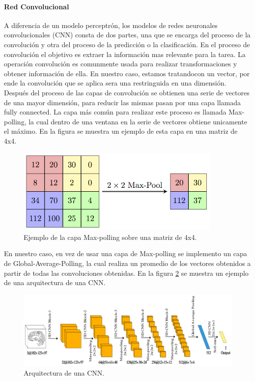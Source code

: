 \paragraph{Red Convolucional}

A diferencia de un modelo perceptrón, los modelos de redes neuronales convolucionales (CNN) consta de dos partes, una que se encarga del proceso de la convolución y otra del proceso de la predicción o la clasificación. En el proceso de convolución el objetivo es extraer la información mas relevante para la tarea. La operación convolución es comunmente usada para realizar transformaciones y obtener información de ella\cite{Unser_1995,Boellaard_1997,Hang_Gao_2009}. En nuestro caso, estamos tratandocon un vector, por ende la convolución que se aplica sera una restringuida en una dimensión. Después del proceso de las capas de convolución se obtienen una serie de vectores de una mayor dimensión, para reducir las mismas pasan por una capa llamada fully connected. La capa más común para realizar este proceso es llamada Max-polling, la cual dentro de una ventana en la serie de vectores obtiene unicamente el máximo. En la figura se muestra un ejemplo de esta capa en una matriz de 4x4.

\begin{figure}[H]
	\centering
	\includegraphics[width=10cm]{Graphics/maxpolling.png}
	\caption{Ejemplo de la capa Max-polling sobre una matriz de 4x4\cite{max_polling_image}.}
	\label{fig:maxpolling}
\end{figure}

En nuestro caso, en vez de usar una capa de Max-polling se implemento un capa de Global-Average-Polling\cite{min_2013}, la cual realiza un promedio de los vectores obtenidos a partir de todas las convoluciones obtenidas. En la figura \ref{fig:cnn} se muestra un ejemplo de una arquitectura de una CNN.

\begin{figure}[H]
	\centering
	\includegraphics[width=14cm]{Graphics/cnn.png}
	\caption{Arquitectura de una CNN\cite{Qu_2020}.}
	\label{fig:cnn}
\end{figure}

